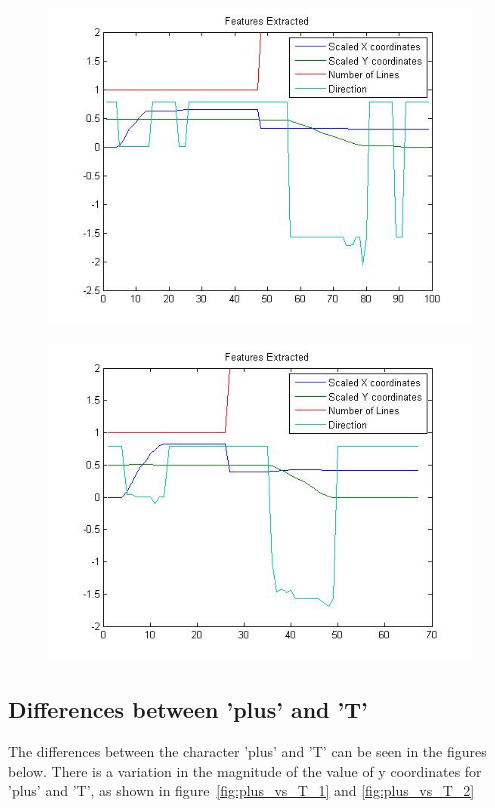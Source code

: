 \begin{figure}[H]
	\centering
	\begin{minipage}{.49\textwidth}
		\centering
		\includegraphics[width=.99\linewidth]{images/deepas/T_random1}
		\label{fig:randT1}
	\end{minipage}
	\begin{minipage}{.49\textwidth}
		\centering
		\includegraphics[width=.99\linewidth]{images/deepas/T_random2}
		\label{fig:randT2}
	\end{minipage}
\end{figure}

\subsection{Differences between 'plus' and 'T'}
The differences between the character 'plus' and 'T' can be seen in the figures below. There is a variation in the magnitude of the value of y coordinates for 'plus' and 'T', as shown in figure~\ref{fig:plus_vs_T_1} and \ref{fig:plus_vs_T_2}


